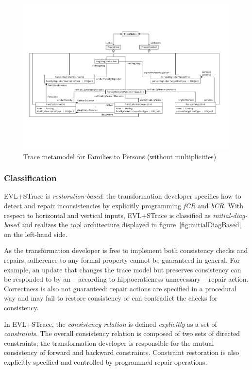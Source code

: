 \begin{figure}[tb!]
	\centering
	\includegraphics[width=\textwidth]{diagrams/solutions/EVLPlusSTraceMetamodel}
	\caption{Trace metamodel for Families to Persons (without multiplicities)}
	\label{fig:evltracemetamodel}
\end{figure}

\subsubsection{Classification}
\label{sec:ClassificationEVL}

EVL+STrace is \emph{restoration-based}: the transformation developer specifies how to detect and repair inconsistencies by explicitly programming \emph{fCR} and \emph{bCR}.
With respect to horizontal and vertical inputs, EVL+STrace is classified as \emph{initial-diag-based} and realizes the tool architecture displayed in figure~\ref{fig:initialDiagBased} on the left-hand side. 

As the transformation developer is free to implement both consistency checks and repairs, adherence to any formal property cannot be guaranteed in general. 
For example, an update that changes the trace model but preserves consistency can be responded to by an -- according to hippocraticness unnecessary -- repair action.
Correctness is also not guaranteed: repair actions are specified in a procedural way and may fail to restore consistency or can contradict the checks for consistency.

In EVL+STrace, the \emph{consistency relation} is defined \emph{explicitly} as a set of  \emph{constraints}.
The overall consistency relation is composed of two sets of directed constraints; the transformation developer is responsible for the mutual consistency of forward and backward constraints.
Constraint restoration is also explicitly specified and controlled by programmed repair operations.

